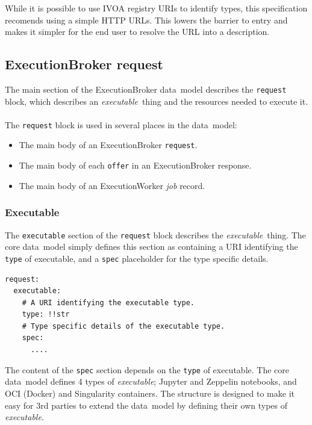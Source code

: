 \documentclass[11pt,a4paper]{ivoa}
\newcommand{\datamodel} {data~model}
\newcommand{\ivoa} {IVOA}
\newcommand{\execbrokerclass} {ExecutionBroker}
\newcommand{\execworkerclass} {ExecutionWorker}
\newcommand{\jupyter} {Jupyter}
\newcommand{\zeppelin} {Zeppelin}
\newcommand{\singularity} {Singularity}
\newcommand{\codeword}[1] {\texttt{#1}}
\newcommand{\executable} {\textit{executable}}
\newcommand{\executablething} {\textit{executable}~thing}
\newcommand{\job} {\textit{job}}
\begin{document}
While it is possible to use \ivoa{} registry URIs to identify types, this specification
recomends using a simple HTTP URLs. This lowers the barrier to entry and makes it simpler for the end user
to resolve the URL into a description.

\subsection{\execbrokerclass{} request}
\label{datamodel-request}

The main section of the \execbrokerclass{} \datamodel{} describes the \codeword{request} block,
which describes an \executablething{} and the resources needed to execute it.
\\
\\
The \codeword{request} block is used in several places in the \datamodel{}:
\begin{itemize}
    \item The main body of an \execbrokerclass{} \codeword{request}.
    \item The main body of each \codeword{offer} in an \execbrokerclass{} response.
    \item The main body of an \execworkerclass{} \job{} record.
\end{itemize}

\subsubsection{Executable}
\label{datamodel-executable}

The \codeword{executable} section of the \codeword{request} block describes the \executablething{}.
The core \datamodel{} simply defines this section as containing a URI identifying the \codeword{type} of executable,
and a \codeword{spec} placeholder for the type specific details.

\begin{lstlisting}[]
request:
  executable:
    # A URI identifying the executable type.
    type: !!str
    # Type specific details of the executable type.
    spec:
      ....
\end{lstlisting}

The content of the \codeword{spec} section depends on the \codeword{type} of executable.
The core \datamodel{} defines 4 types of \executable{};
\jupyter{} and \zeppelin{} notebooks, and OCI (Docker) and \singularity{} containers.
The structure is designed to make it easy for 3rd parties to extend the \datamodel{}
by defining their own types of \executable{}.
\end{document}
